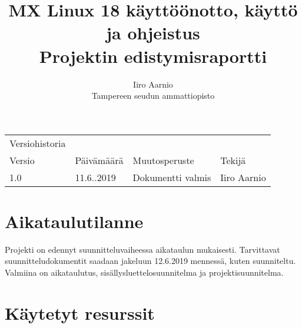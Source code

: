\documentclass[a4paper, 12pt, finnish]{article}
\title{MX Linux 18 käyttöönotto, käyttö ja ohjeistus \\ \large Projektin edistymisraportti} %
\author{Iiro Aarnio \\ Tampereen seudun ammattiopisto \\}
\begin{document}
\maketitle
\thispagestyle{empty} %

\newpage
\thispagestyle{empty}
\begin{table}[htpb]
	\begin{tabular}{llll}
		Versiohistoria &            &                         &             \\
		\rowcolor[HTML]{FFCCC9}
		Versio         & Päivämäärä & Muutosperuste           & Tekijä      \\
		1.0              & 11.6..2019   & Dokumentti valmis       & Iiro Aarnio \\
	\end{tabular}
\end{table}


\newpage
\thispagestyle{empty} %

\tableofcontents

\newpage
{} %

\setcounter{page}{1} %
\newpage
\section{Aikataulutilanne}
Projekti on edennyt suunnitteluvaiheessa aikataulun mukaisesti. Tarvittavat suunnitteludokumentit saadaan jakeluun 12.6.2019 mennessä, kuten suunniteltu. Valmiina on aikataulutus, sisällysluettelosuunnitelma ja projektisuunnitelma.

\section{Käytetyt resurssit}
\end{document}
